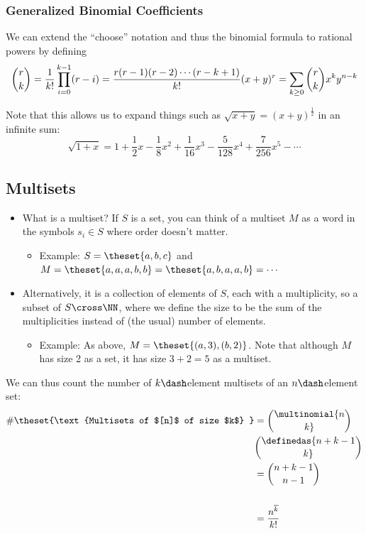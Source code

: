 \hypertarget{generalized-binomial-coefficients}{%
\subsubsection{Generalized Binomial
Coefficients}\label{generalized-binomial-coefficients}}

We can extend the ``choose'' notation and thus the binomial formula to
rational powers by defining \[
{r \choose k} = \frac{1}{k!} \prod_{i=0}^{k-1} (r - i) = \frac{r(r-1)(r-2)\cdots(r-k+1)}{k!}\\
(x+y)^r = \sum_{k\geq 0} {r\choose k} x^ky^{n-k}
\]

Note that this allows us to expand things such as
\(\sqrt{x+y} = (x+y)^\frac{1}{2}\) in an infinite sum: \[
\sqrt { 1 + x } = 1 + \frac { 1 } { 2 } x - \frac { 1 } { 8 } x ^ { 2 } + \frac { 1 } { 16 } x ^ { 3 } - \frac { 5 } { 128 } x ^ { 4 } + \frac { 7 } { 256 } x ^ { 5 } - \cdots
\]

\hypertarget{multisets}{%
\subsection{Multisets}\label{multisets}}

\begin{itemize}
\tightlist
\item
  What is a multiset? If \(S\) is a set, you can think of a multiset
  \(M\) as a word in the symbols \(s_i \in S\) where order doesn't
  matter.

  \begin{itemize}
  \tightlist
  \item
    Example: \(S = \theset{a,b,c}\) and
    \(M = \theset{a,a,a,b,b} = \theset{a,b,a,a,b} = \cdots\)
  \end{itemize}
\item
  Alternatively, it is a collection of elements of \(S\), each with a
  multiplicity, so a subset of \(S \cross \NN\), where we define the
  size to be the sum of the multiplicities instead of (the usual) number
  of elements.

  \begin{itemize}
  \tightlist
  \item
    Example: As above, \(M = \theset{(a, 3), (b,2)}\). Note that
    although \(M\) has size 2 as a set, it has size \(3+2 = 5\) as a
    multiset.
  \end{itemize}
\end{itemize}

We can thus count the number of \(k\dash\)element multisets of an
\(n\dash\)element set: \[\begin{aligned}
\#\theset{\text{Multisets of $[n]$ of size $k$} } &= \multinomial{n\choose k} \\ &\definedas {{n+k-1}\choose k} \\ &= {{n+k-1}\choose n-1} \\ \\ &= \frac{n^{\overline k}}{k!}
\end{aligned}\]

